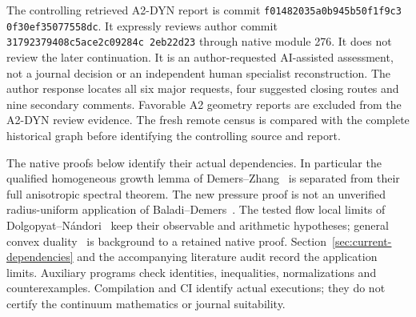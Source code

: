 \documentclass[11pt,reqno]{amsart}
\numberwithin{equation}{section}
\theoremstyle{definition}\newtheorem{definition}[theorem]{Definition}
\theoremstyle{remark}\newtheorem{remark}[theorem]{Remark}
\begin{document}
The controlling retrieved A2-DYN report is commit
\texttt{f0148203\allowbreak5a0b945b\allowbreak50f1f9c3\allowbreak
0f30ef35\allowbreak077558dc}. It expressly reviews author commit
\texttt{31792379\allowbreak408c5ace\allowbreak2c09284c\allowbreak
2eb22d23} through native module 276.
It does not review the later continuation. It is an author-requested
AI-assisted assessment, not a journal decision or an independent
human specialist reconstruction. The author response locates all
six major requests, four suggested closing routes and nine secondary
comments. Favorable A2 geometry reports are excluded from the A2-DYN
review evidence. The fresh remote census is compared with the complete
historical graph before identifying the controlling source and report.

The native proofs below identify their actual dependencies. In
particular the qualified homogeneous growth lemma of
Demers--Zhang~\cite[Lemma 3.2(b), PDF p.~12]{DZUniform} is separated
from their full anisotropic spectral theorem. The new pressure proof
is not an unverified radius-uniform application of
Baladi--Demers~\cite{BDPressure}. The tested flow local limits of
Dolgopyat--N\'andori~\cite{DNFlow} keep their observable and arithmetic
hypotheses; general convex duality~\cite{BVNotes} is background to a
retained native proof. Section~\ref{sec:current-dependencies} and
the accompanying literature audit record the application limits.
Auxiliary programs check identities, inequalities, normalizations
and counterexamples. Compilation and CI identify actual executions;
they do not certify the continuum mathematics or journal suitability.
\end{document}
